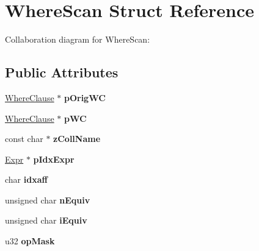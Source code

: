 \hypertarget{structWhereScan}{}\section{Where\+Scan Struct Reference}
\label{structWhereScan}


Collaboration diagram for Where\+Scan\+:
\subsection*{Public Attributes}
\begin{DoxyCompactItemize}
\item 
\hyperlink{structWhereClause}{Where\+Clause} $\ast$ {\bfseries p\+Orig\+WC}\hypertarget{structWhereScan_a848dc138a80d4e16ce5044e3d3125831}{}\label{structWhereScan_a848dc138a80d4e16ce5044e3d3125831}

\item 
\hyperlink{structWhereClause}{Where\+Clause} $\ast$ {\bfseries p\+WC}\hypertarget{structWhereScan_a255e78bbf5eb2aafe98d5f0285c1987c}{}\label{structWhereScan_a255e78bbf5eb2aafe98d5f0285c1987c}

\item 
const char $\ast$ {\bfseries z\+Coll\+Name}\hypertarget{structWhereScan_aa21062fab71aadb240a866ff0b5e1a98}{}\label{structWhereScan_aa21062fab71aadb240a866ff0b5e1a98}

\item 
\hyperlink{structExpr}{Expr} $\ast$ {\bfseries p\+Idx\+Expr}\hypertarget{structWhereScan_ae93d54128df8188241c2432b0c394e64}{}\label{structWhereScan_ae93d54128df8188241c2432b0c394e64}

\item 
char {\bfseries idxaff}\hypertarget{structWhereScan_ada63a4e977c20a66b858e4b182ff8f87}{}\label{structWhereScan_ada63a4e977c20a66b858e4b182ff8f87}

\item 
unsigned char {\bfseries n\+Equiv}\hypertarget{structWhereScan_a80ee79b4e2809c0310a892e93ba5dcfe}{}\label{structWhereScan_a80ee79b4e2809c0310a892e93ba5dcfe}

\item 
unsigned char {\bfseries i\+Equiv}\hypertarget{structWhereScan_a52812709e4b6257a3084dd091ddaf568}{}\label{structWhereScan_a52812709e4b6257a3084dd091ddaf568}

\item 
u32 {\bfseries op\+Mask}\hypertarget{structWhereScan_a52f27b144ffed79df3400868e52dd583}{}\label{structWhereScan_a52f27b144ffed79df3400868e52dd583}


\end{DoxyCompactItemize}
